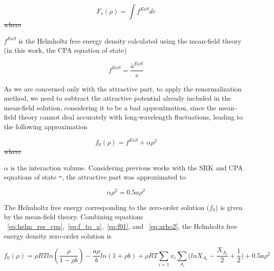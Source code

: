 \documentclass[preprint,12pt,3p]{elsarticle}
\providecommand{\DIFadd}[1]{{\protect\color{blue}\uwave{#1}}} %
\providecommand{\DIFdel}[1]{{\protect\color{red}\sout{#1}}}                      %
\providecommand{\DIFaddbegin}{} %
\providecommand{\DIFaddend}{} %
\providecommand{\DIFdelbegin}{} %
\providecommand{\DIFdelend}{} %
\begin{document}
\DIFaddend \begin{equation} \label{eq:Fs}
    F_{s}(\rho) = \int f^{EoS} dr
\end{equation}
\DIFdelbegin \DIFdel{where }\DIFdelend \DIFaddbegin 

    \DIFadd{Where }\DIFaddend $f^{EoS}$ is the Helmholtz free energy density calculated using the mean-field theory (in this work, the CPA equation of state)
\DIFaddbegin 

\DIFaddend \begin{equation} \label{eq:f_to_a}
    f^{EoS} = \frac{\bar{a}^{EoS}}{v}
\end{equation}

    As we are concerned only with the attractive part, to apply the renormalization method, we need to subtract the attractive potential already included in the mean-field solution, considering it to be a bad approximation, since the mean-field theory cannot deal accurately with long-wavelength fluctuations, leading to the following approximation
    \DIFaddbegin 

\DIFaddend \begin{equation} \label{eq:f01}
    f_{0}(\rho) = f^{EoS} + \alpha\rho^2
\end{equation}
    \DIFdelbegin \DIFdel{where }\DIFdelend \DIFaddbegin 

    \DIFadd{Where }\DIFaddend $\alpha$ is the interaction volume. Considering previous works with the SRK and CPA equations of state \DIFdelbegin \DIFdel{~}\DIFdelend \cite{cai2004thermodynamics,pcm2017application,xu2010crossover}, the attractive part was approximated to
\DIFaddbegin 

\DIFaddend \begin{equation} \label{eq:arho2}
    \alpha\rho^2 = 0.5a\rho^2
\end{equation}

    The Helmholtz free energy corresponding to the zero-order solution ($f_{0}$) is given by the mean-field theory. Combining equations ~\ref{eq:helm_res_cpa},~\ref{eq:f_to_a},~\ref{eq:f01}, and ~\ref{eq:arho2}, the Helmholtz free energy density zero-order solution is
\DIFaddbegin 

\DIFaddend \begin{equation} \label{eq:f00}
f_{0}(\rho) = \rho RTln(\frac{\rho}{1-\rho b})-\frac{a\rho}{b}ln(1+\rho b) + \rho RT\sum_{i=1} x_{i} \sum_{A_{i}}\DIFdelbegin %
\DIFdelend \DIFaddbegin \Big(\DIFaddend lnX_{A_{i}} - \frac{X_{A_{i}}}{2} + \frac{1}{2}\DIFdelbegin %
\DIFdelend \DIFaddbegin \Big) \DIFaddend + 0.5a\rho^2
\end{equation}  
\end{document}
